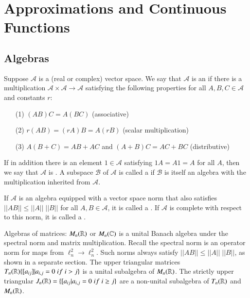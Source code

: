 \chapter{Approximations and Continuous Functions}

\section{Algebras}

\begin{definition}
    Suppose $\mathcal{A}$ is a (real or complex) vector space. We say that $\mathcal{A}$ is an  if there is a multiplication $\mathcal{A}\times \mathcal{A}\rightarrow \mathcal{A}$ satisfying the following properties for all $A,B,C \in \mathcal{A}$ and constants $r$: \begin{itemize}
        \item[(1)] $(AB)C = A(BC)$ (associative)
        \item[(2)] $r(AB) = (rA)B = A(rB)$ (scalar multiplication)
        \item[(3)] $A(B+C) = AB+AC$ and $(A+B)C = AC+BC$ (distributive)
    \end{itemize}
    If in addition there is an element $1 \in \mathcal{A}$ satisfying $1A = A1 = A$ for all $A$, then we say that $\mathcal{A}$ is . A subspace $\mathcal{B}$ of $\mathcal{A}$ is called a  if $\mathcal{B}$ is itself an algebra with the multiplication inherited from $\mathcal{A}$.
\end{definition}

\begin{definition}
    If $\mathcal{A}$ is an algebra equipped with a vector space norm that also satisfies $||AB||\leq ||A||\;||B||$ for all $A,B \in \mathcal{A}$, it is called a . If $\mathcal{A}$ is complete with respect to this norm, it is called a .
\end{definition}

\begin{example}
    Algebras of matrices: $M_n(\mathbb R)$ or $M_n(\mathbb C)$ is a unital Banach algebra under the spectral norm and matrix multiplication. Recall the spectral norm is an operator norm for maps from $\ell_n^2\rightarrow \ell_n^2$. Such norms always satisfy $||AB|| \leq ||A||\;||B||$, as shown in a separate section. The upper triangular matrices $T_n(\mathbb R)\{[a_{ij}]\vert a_{i,j} = 0\;if\; i > j\}$ is a unital subalgebra of $M_n(\mathbb R)$. The strictly upper triangular $J_n(\mathbb R) = \{[a_{ij}\vert a_{i,j} = 0\;if\;i\geq j\}$ are a non-unital subalgebra of $T_n(\mathbb R)$ and $M_n(\mathbb R)$.
\end{example}

